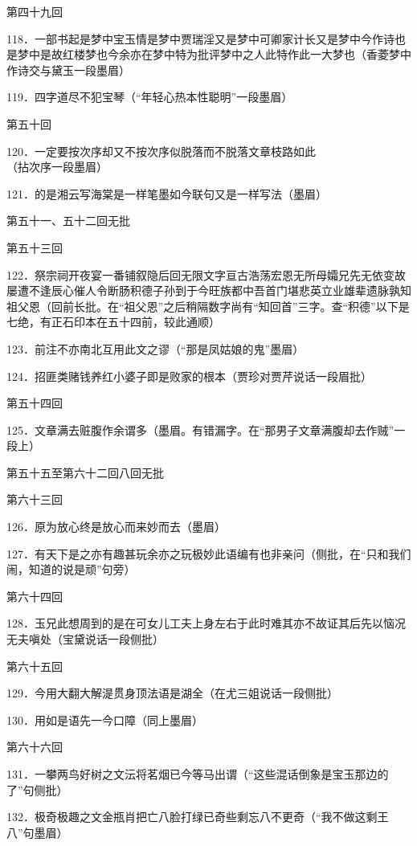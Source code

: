 \href{../Text/part0087.html\#navto_t_a}{}

第四十九回

118．一部书起是梦中宝玉情是梦中贾瑞淫又是梦中可卿家计长又是梦中今作诗也是梦中是故红楼梦也今余亦在梦中特为批评梦中之人此特作此一大梦也{（\kaishu 香菱梦中作诗交与黛玉一段墨眉）}

119．四字道尽不犯宝琴{（\kaishu ``年轻心热本性聪明''一段墨眉）}

第五十回

120．一定要按次序却又不按次序似脱落而不脱落文章枝路如此{（\kaishu 拈次序一段墨眉）}

121．的是湘云写海棠是一样笔墨如今联句又是一样写法{（\kaishu 墨眉）}

第五十一、五十二回无批

第五十三回

122．祭宗祠开夜宴一番铺叙隐后回无限文字亘古浩荡宏恩无所母孀兄先无依变故屡遭不逢辰心催人令断肠积德子孙到于今旺族都中吾首门堪悲英立业雄辈遗脉孰知祖父恩{（\kaishu 回前长批。在``祖父恩''之后稍隔数字尚有``知回首''三字。查``积德''以下是七绝，有正石印本在五十四前，较此通顺）}

123．前注不亦南北互用此文之谬{（\kaishu ``那是凤姑娘的鬼''墨眉）}

124．招匪类赌钱养红小婆子即是败家的根本{（\kaishu 贾珍对贾芹说话一段眉批）}

第五十四回

125．文章满去赃腹作余谓多{（\kaishu 墨眉。有错漏字。在``那男子文章满腹却去作贼''一段上）}

第五十五至第六十二回八回无批

第六十三回

126．原为放心终是放心而来妙而去{（\kaishu 墨眉）}

127．有天下是之亦有趣甚玩余亦之玩极妙此语编有也非亲问{（\kaishu 侧批，在``只和我们闹，知道的说是顽''句旁）}

第六十四回

128．玉兄此想周到的是在可女儿工夫上身左右于此时难其亦不故证其后先以恼况无夫嗔处{（\kaishu 宝黛说话一段侧批）}

第六十五回

129．今用大翻大解湜贯身顶法语是湖全{（\kaishu 在尤三姐说话一段侧批）}

130．用如是语先一今口障{（\kaishu 同上墨眉）}

第六十六回

131．一攀两鸟好树之文沄将茗烟已今等马出谓{（\kaishu ``这些混话倒象是宝玉那边的了''句侧批）}

132．极奇极趣之文金瓶肖把亡八脸打绿已奇些剩忘八不更奇{（\kaishu ``我不做这剩王八''句墨眉）}

